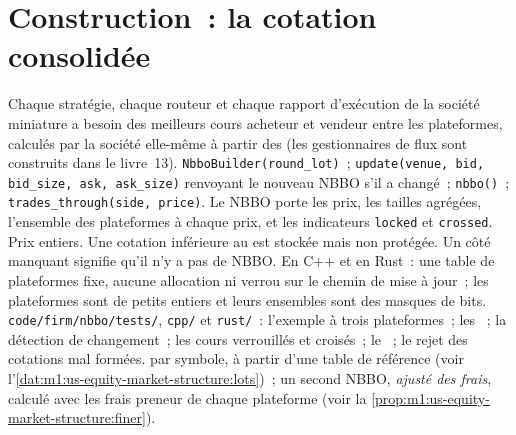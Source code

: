 \section{Construction~: la cotation consolidée}\label{bld:m1:us-equity-market-structure:nbbo}

\begin{build}
 Chaque stratégie, chaque routeur et chaque rapport d'exécution de la société miniature
a besoin des meilleurs cours acheteur et vendeur entre les plateformes, calculés par la société
elle-même à partir des  (les gestionnaires de flux sont construits dans le
livre~13).
 \texttt{NbboBuilder(round\_lot)}~;
\texttt{update(venue, bid, bid\_size, ask, ask\_size)} renvoyant le nouveau NBBO
s'il a changé~; \texttt{nbbo()}~; \texttt{trades\_through(side, price)}. Le
NBBO porte les prix, les tailles agrégées, l'ensemble des plateformes à chaque prix, et
les indicateurs \texttt{locked} et \texttt{crossed}.
 Prix entiers. Une cotation inférieure au  est stockée
mais non protégée. Un côté manquant signifie qu'il n'y a pas de NBBO. En C++ et en Rust~: une
table de plateformes fixe, aucune allocation ni verrou sur le chemin de mise à jour~; les plateformes
sont de petits entiers et leurs ensembles sont des masques de bits.
 \texttt{code/firm/nbbo/tests/}, \texttt{cpp/} et
\texttt{rust/}~: l'exemple à trois plateformes~; les ~; la détection de changement~;
les cours verrouillés et croisés~; le ~; le rejet des cotations mal formées.
  par symbole, à partir d'une table de référence
(voir l'\cref{dat:m1:us-equity-market-structure:lots})~; un second NBBO, \emph{ajusté des frais},
calculé avec les frais preneur de chaque plateforme
(voir la \cref{prop:m1:us-equity-market-structure:finer}).
\end{build}


